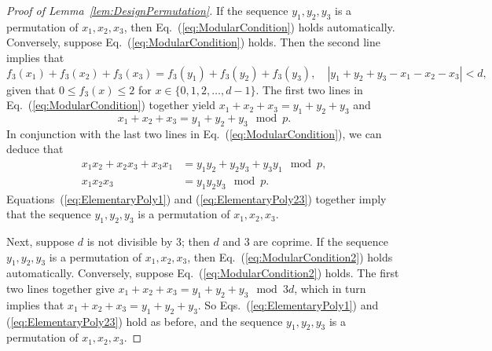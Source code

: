 \documentclass[10pt,a4paper]{amsart}
\newcommand{\Eqsref}[2]{Equations~(\ref{#1}) and (\ref{#2})}
\newcommand{\eqsref}[2]{Eqs.~(\ref{#1}) and (\ref{#2})}
\newcommand{\eref}[1]{Eq.~\textup{(\ref{#1})}}
\newcommand{\lref}[1]{Lemma~\ref{#1}}
\newcommand{\mmod}{\!\mod}
\begin{document}
\begin{proof}[Proof of \lref{lem:DesignPermutation}]
If the sequence $y_1, y_2, y_3$ is a permutation of $x_1, x_2, x_3$, then \eref{eq:ModularCondition} holds automatically. Conversely, suppose \eref{eq:ModularCondition} holds. Then the second line implies that 
\begin{equation}
f_3(x_1)+f_3(x_2)+f_3(x_3)=f_3(y_1)+f_3(y_2)+f_3(y_3),\quad |y_1+y_2+y_3-x_1-x_2-x_3|<d,
\end{equation}
given that $0\leq f_3(x)\leq 2$ for $x\in \{0,1,2,\ldots, d-1\}$. The first two lines in \eref{eq:ModularCondition} together yield $x_1+x_2+x_3=y_1+y_2+y_3$ and
\begin{equation}\label{eq:ElementaryPoly1}
x_1+x_2+x_3=y_1+y_2+y_3\mmod p.
\end{equation}
In conjunction with the last two lines in \eref{eq:ModularCondition}, we can deduce that
\begin{equation}\label{eq:ElementaryPoly23}
\begin{aligned}
x_1 x_2 +x_2 x_3+x_3x_1 &= y_1 y_2 +y_2 y_3+y_3y_1 \mmod p, \\
x_1 x_2 x_3 &= y_1 y_2 y_3 \mmod p.
\end{aligned}
\end{equation}
\Eqsref{eq:ElementaryPoly1}{eq:ElementaryPoly23} together imply that the sequence $y_1, y_2, y_3$ is a permutation of $x_1, x_2, x_3$.

Next, suppose $d$ is not divisible by 3; then $d$ and 3 are coprime. If the sequence $y_1, y_2, y_3$ is a permutation of $x_1, x_2, x_3$, then \eref{eq:ModularCondition2} holds automatically. Conversely, suppose \eref{eq:ModularCondition2} holds. The first two lines together give $x_1+x_2+x_3=y_1+y_2+y_3 \mmod 3d$, which in turn implies that $x_1+x_2+x_3=y_1+y_2+y_3$. So \eqsref{eq:ElementaryPoly1}{eq:ElementaryPoly23} hold as before, and the sequence $y_1, y_2, y_3$ is a permutation of $x_1, x_2, x_3$.
\end{proof}
\end{document}
